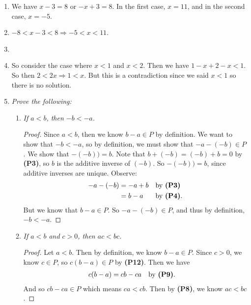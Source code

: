 \documentclass[12pt]{amsbook}
\theoremstyle{plain}
\numberwithin{section}{chapter}
\numberwithin{equation}{chapter}
\theoremstyle{definition}
\theoremstyle{remark}
\theoremstyle{plain}
\newcommand{\bb}{\vspace{3mm}}
\newcommand{\bee}{\begin{equation}\begin{aligned}}
\newcommand{\eee}{\end{aligned}\end{equation}}
\begin{document}
\begin{enumerate}[label=\roman*)]
\item We have $x - 3 = 8$ or $-x + 3 = 8$. In the first case, $x = 11$, and in the second case, $x = -5$. 
\item $-8 < x - 3 < 8 \Rightarrow -5 < x < 11$. 
\item 
\item So consider the case where $x < 1$ and $x < 2$. Then we have $1 - x + 2 - x < 1$. So then $2 < 2x \Rightarrow 1 < x$. But this is a contradiction since we said $x < 1$ so there is no solution. 

\setcounter{enumi}{4}
\item \textit{Prove the following: }
\begin{enumerate}[label=(\roman*)]

\bb
\setcounter{enumii}{1}
\item \textit{If $a < b$, then $-b < -a$. }
\begin{proof}
Since $a < b$, then we know $b - a \in P$ by definition. We want to show that $-b < -a$, so by definition, we must show that $-a - (-b) \in P$. We show that $-(-b)) = b$. Note that $b + (-b) = (-b) + b = 0$ by \textbf{(P3)}, so $b$ is the additive inverse of $(-b)$. So $-(-b)) = b$, since additive inverses are unique. Observe:
\bee
-a - (-b) &= -a + b && \text{by \textbf{(P3)}}\\
		  &= b - a  && \text{by \textbf{(P4)}.}\\
\eee
But we know that $b - a \in P$. So $-a - (-b) \in P$, and thus by definition, $-b < -a$. 
\end{proof}

\bb
\setcounter{enumii}{3}
\item \textit{If $a < b$ and $c > 0$, then $ac < bc$. }
\begin{proof}
Let $a < b$. Then by definition, we know $b - a \in P$. Since $c > 0$, we know $c \in P$, so $c(b - a) \in P$ by \textbf{(P12)}. Then we have
\bee
c(b - a) &= cb - ca && \text{by \textbf{(P9)}}.
\eee
And so $cb - ca \in P$ which means $ca < cb$. Then by \textbf{(P8)}, we know $ac < bc$. 
\end{proof}



\end{enumerate}
\end{enumerate}
\end{document}
